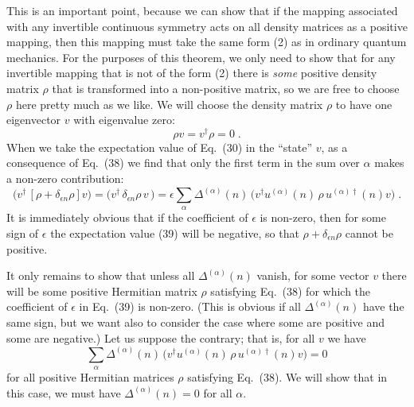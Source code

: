 \documentclass[12pt]{article}
\begin{document}
This is an important point, because we can show that if the mapping associated with  any invertible continuous symmetry  acts on all density matrices as a positive mapping, then this mapping must take the same form (2)  as in ordinary quantum mechanics.  For the purposes of this theorem, we only need to show that for any invertible mapping that is not of the form (2) there is  {\it some} positive density matrix $\rho$ that is transformed into a non-positive matrix, so we are free to choose $\rho$ here pretty much as we like.  We will choose the density matrix $\rho$ to have  one  eigenvector $v$ with eigenvalue zero:
\begin{equation}
\rho v=v^\dagger\rho=0\;.
\end{equation}
When we take the  expectation value of Eq.~(30) in the ``state'' $v$, as a consequence of Eq.~(38) we find that only  the first term in the sum over $\alpha$ makes a non-zero contribution:
\begin{equation}
\Big(v^\dagger \,[\rho+\delta_{\epsilon n}\rho]v\Big)= \Big(v^\dagger\, \delta_{\epsilon n}\rho\, v\,\Big)=\epsilon\sum_\alpha  \Delta^{(\alpha)}(n)\, \Big(v^\dagger u^{(\alpha)}(n)\,\rho\, u^{(\alpha)\dagger}(n)v\Big)\;.
\end{equation}
It is immediately obvious that if the coefficient of $\epsilon$ is non-zero, then for some sign of $\epsilon$ the expectation value (39) will be negative, so that
$\rho+\delta_{\epsilon n}\rho$ cannot be positive.  

It only remains to show that unless all $\Delta^{(\alpha)}(n)$ vanish, for some  vector $v$ there will be some positive Hermitian matrix $\rho$ satisfying Eq.~(38) for which the coefficient of $\epsilon$ in Eq.~(39) is non-zero.  (This is obvious if all $\Delta^{(\alpha)}(n)$ have the same sign, but we want also to consider the case where some are positive and some are negative.)  Let us suppose the contrary; that is, for all $v$ we have 
\begin{equation}
\sum_\alpha  \Delta^{(\alpha)}(n)\,\Big( v^\dagger u^{(\alpha)}(n)\,\rho\, u^{(\alpha)\dagger}(n)v\Big) =0
\end{equation}
for all positive Hermitian matrices $\rho$ satisfying Eq.~(38).  We will show that in this case, we must have $\Delta^{(\alpha)}(n)=0$ for all $\alpha$.  
\end{document}
